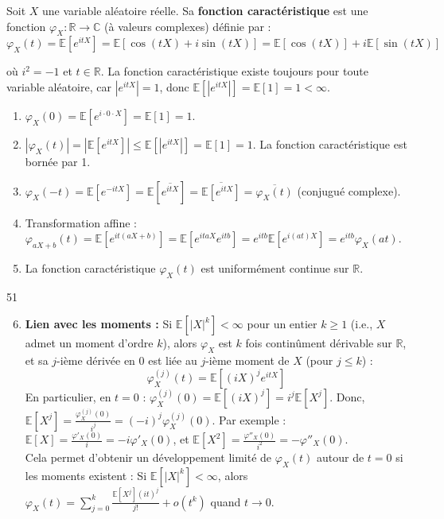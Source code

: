 \begin{definition}
Soit $X$ une variable aléatoire réelle. Sa \textbf{fonction caractéristique} est une fonction $\varphi_X : \mathbb{R} \to \mathbb{C}$ (à valeurs complexes) définie par :
$$\varphi_X(t) = \mathbb{E}[e^{itX}] = \mathbb{E}[\cos(tX) + i\sin(tX)] = \mathbb{E}[\cos(tX)] + i\mathbb{E}[\sin(tX)]$$
\end{definition}

\noindent où $i^2 = -1$ et $t \in \mathbb{R}$. La fonction caractéristique existe toujours pour toute variable aléatoire, car $|e^{itX}| = 1$, donc $\mathbb{E}[|e^{itX}|] = \mathbb{E}[1] = 1 < \infty$.

\begin{remarque}
\begin{enumerate}
    \item $\varphi_X(0) = \mathbb{E}[e^{i \cdot 0 \cdot X}] = \mathbb{E}[1] = 1$.
    \item $|\varphi_X(t)| = |\mathbb{E}[e^{itX}]| \le \mathbb{E}[|e^{itX}|] = \mathbb{E}[1] = 1$. La fonction caractéristique est bornée par 1.
    \item $\varphi_X(-t) = \mathbb{E}[e^{-itX}] = \mathbb{E}[\overline{e^{itX}}] = \overline{\mathbb{E}[e^{itX}]} = \overline{\varphi_X(t)}$ (conjugué complexe).
    \item Transformation affine : $\varphi_{aX+b}(t) = \mathbb{E}[e^{it(aX+b)}] = \mathbb{E}[e^{itaX}e^{itb}] = e^{itb}\mathbb{E}[e^{i(at)X}] = e^{itb}\varphi_X(at)$.
    \item La fonction caractéristique $\varphi_X(t)$ est uniformément continue sur $\mathbb{R}$.
\end{enumerate}
\end{remarque}

\begin{center}
    51
\end{center}

\begin{enumerate}
    \setcounter{enumi}{5}
    \item \textbf{Lien avec les moments :} Si $\mathbb{E}[|X|^k] < \infty$ pour un entier $k \ge 1$ (i.e., $X$ admet un moment d'ordre $k$), alors $\varphi_X$ est $k$ fois continûment dérivable sur $\mathbb{R}$, et sa $j$-ième dérivée en 0 est liée au $j$-ième moment de $X$ (pour $j \le k$) :
    $$\varphi_X^{(j)}(t) = \mathbb{E}[(iX)^j e^{itX}]$$
    En particulier, en $t=0$ : $\varphi_X^{(j)}(0) = \mathbb{E}[(iX)^j] = i^j \mathbb{E}[X^j]$. Donc, $\mathbb{E}[X^j] = \frac{\varphi_X^{(j)}(0)}{i^j} = (-i)^j \varphi_X^{(j)}(0)$. Par exemple : $\mathbb{E}[X] = \frac{\varphi'_X(0)}{i} = -i\varphi'_X(0)$, et $\mathbb{E}[X^2] = \frac{\varphi''_X(0)}{i^2} = -\varphi''_X(0)$.\\
    Cela permet d'obtenir un développement limité de $\varphi_X(t)$ autour de $t=0$ si les moments existent : Si $\mathbb{E}[|X|^k] < \infty$, alors $\varphi_X(t) = \sum_{j=0}^k \frac{\mathbb{E}[X^j](it)^j}{j!} + o(t^k)$ quand $t \to 0$.
\end{enumerate}


